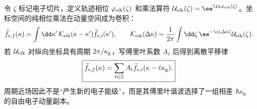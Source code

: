 令 $\zeta$ 标记电子切片，定义轨迹相位 $\varphi_{\rm eik}(\zeta)$ 和乘法算符 $\mathcal U_{\rm eik}(\zeta)=\ee^{\ii\varphi_{\rm eik}(\zeta)}$。坐标空间的纯相位乘法在动量空间成为卷积：
\begin{equation*}
\widetilde f_{\mathrm e,f}(\kappa)=\int\dd \kappa'\,\mathcal K_{\rm eik}(\kappa-\kappa')\widetilde f_{\mathrm e,i}(\kappa'),
\qquad
\mathcal K_{\rm eik}(\Delta\kappa)=\frac1{2\pi}\int\dd\zeta\,\ee^{-\ii\Delta\kappa\zeta}\mathcal U_{\rm eik}(\zeta).
\end{equation*}
若 $\mathcal U_{\rm eik}$ 对纵向坐标具有周期 $2\pi/\kappa_{\rm g}$，写傅里叶系数 $A_\ell$ 后得到离散平移律
\begin{equation}
\boxed{
\widetilde f_{\mathrm e,f}(\kappa)=\sum_{\ell\in\mathbb Z}A_\ell\widetilde f_{\mathrm e,i}(\kappa-\ell\kappa_{\rm g}).}
\label{eq:general_periodic_eikonal_discrete_convolution}
\end{equation}
周期近场因此不是“产生新的电子能级”，而是其傅里叶谐波选择了一组相差 $\hbar\kappa_{\rm g}$ 的自由电子动量副本。

